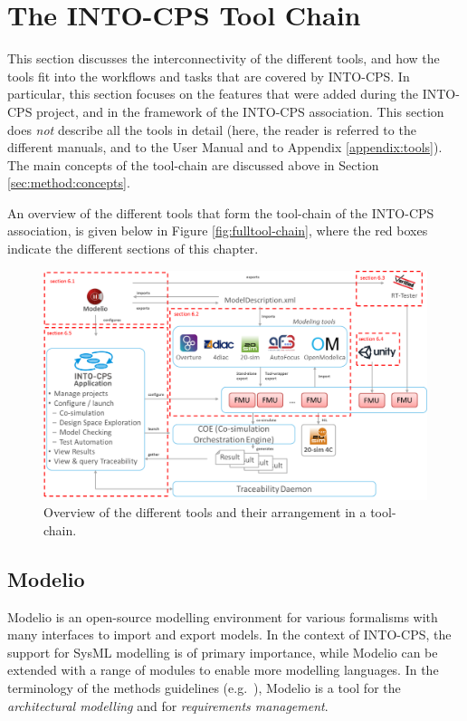 
\section{The INTO-CPS Tool Chain}\label{sec:toolchain}

This section discusses the interconnectivity of the different tools, and how the tools fit into the workflows and tasks that are covered by INTO-CPS. In particular, this section focuses on the features that were added during the INTO-CPS project, and in the framework of the INTO-CPS association. This section does \textit{not} describe all the tools in detail (here, the reader is referred to the different manuals, and to the User Manual \cite{INTOCPSD4.3a} and to Appendix \ref{appendix:tools}). The main concepts of the tool-chain are discussed above in Section \ref{sec:method:concepts}.

An overview of the different tools that form the tool-chain of the INTO-CPS association, is given below in Figure \ref{fig:fulltool-chain}, where the red boxes indicate the different sections of this chapter.

\begin{figure}[!ht]
	\centering
		\includegraphics[width=0.9 \textwidth]{./figures/toolchain_association}
	\caption{Overview of the different tools and their arrangement in a tool-chain.}
	\label{fig:fullool-chain}
\end{figure}

\subsection{Modelio}
\label{sec:modelio}
Modelio is an open-source modelling environment for various formalisms with many interfaces to import and export models. In the context of INTO-CPS, the support for SysML modelling is of primary importance, while Modelio can be extended with a range of modules to enable more modelling languages. In the terminology of the methods guidelines (e.g.\ \cite{INTOCPSD3.3a}), Modelio is a tool for the \textit{architectural modelling} and for \textit{requirements management}.

